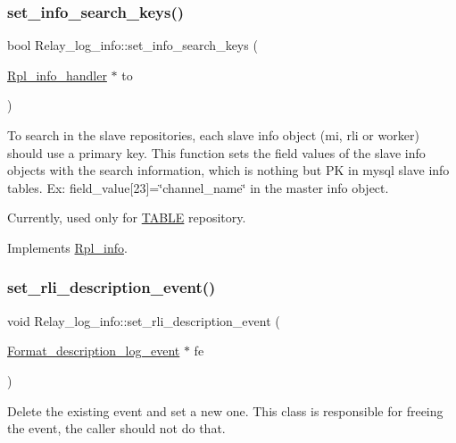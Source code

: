 \subsubsection{\texorpdfstring{set\+\_\+info\+\_\+search\+\_\+keys()}{set\_info\_search\_keys()}}
{\footnotesize\ttfamily bool Relay\+\_\+log\+\_\+info\+::set\+\_\+info\+\_\+search\+\_\+keys (\begin{DoxyParamCaption}\item[{\mbox{\hyperlink{classRpl__info__handler}{Rpl\+\_\+info\+\_\+handler}} $\ast$}]{to }\end{DoxyParamCaption})\hspace{0.3cm}{\ttfamily [virtual]}}

To search in the slave repositories, each slave info object (mi, rli or worker) should use a primary key. This function sets the field values of the slave info objects with the search information, which is nothing but PK in mysql slave info tables. Ex\+: field\+\_\+value\mbox{[}23\mbox{]}=\char`\"{}channel\+\_\+name\char`\"{} in the master info object.

Currently, used only for \mbox{\hyperlink{structTABLE}{T\+A\+B\+LE}} repository. 

Implements \mbox{\hyperlink{classRpl__info_a0b3b3cf032e7017f1760379364ff1738}{Rpl\+\_\+info}}.

\mbox{\label{classRelay__log__info_abf39e8666f951158a5dd9c074a2b12d6}} 
\subsubsection{\texorpdfstring{set\+\_\+rli\+\_\+description\+\_\+event()}{set\_rli\_description\_event()}}
{\footnotesize\ttfamily void Relay\+\_\+log\+\_\+info\+::set\+\_\+rli\+\_\+description\+\_\+event (\begin{DoxyParamCaption}\item[{\mbox{\hyperlink{classFormat__description__log__event}{Format\+\_\+description\+\_\+log\+\_\+event}} $\ast$}]{fe }\end{DoxyParamCaption})\hspace{0.3cm}{\ttfamily [virtual]}}

Delete the existing event and set a new one. This class is responsible for freeing the event, the caller should not do that.

